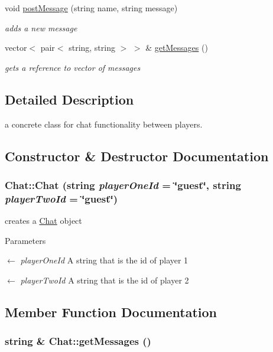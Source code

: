\begin{DoxyCompactItemize}
void \hyperlink{classChat_a02ce14db9d4c1c1aa7f5cb40df16eb60}{postMessage} (string name, string message)
\begin{DoxyCompactList}\small\item\em adds a new message \item\end{DoxyCompactList}\item 
vector$<$ pair$<$ string, string $>$ $>$ \& \hyperlink{classChat_a238969ca251c9fdd893b4466e6dea8ba}{getMessages} ()
\begin{DoxyCompactList}\small\item\em gets a reference to vector of messages \item\end{DoxyCompactList}\end{DoxyCompactItemize}


\subsection{Detailed Description}
a concrete class for chat functionality between players. 

\subsection{Constructor \& Destructor Documentation}
\hypertarget{classChat_abc23d9c9b254089b8f486bd0ef6bc225}{
\subsubsection[{Chat}]{\setlength{\rightskip}{0pt plus 5cm}Chat::Chat (string {\em playerOneId} = {\ttfamily \char`\"{}guest\char`\"{}}, \/  string {\em playerTwoId} = {\ttfamily \char`\"{}guest\char`\"{}})}}
\label{classChat_abc23d9c9b254089b8f486bd0ef6bc225}


creates a \hyperlink{classChat}{Chat} object 
\begin{DoxyParams}{Parameters}
\item[\mbox{$\leftarrow$} {\em playerOneId}]A string that is the id of player 1 \item[\mbox{$\leftarrow$} {\em playerTwoId}]A string that is the id of player 2 \end{DoxyParams}


\subsection{Member Function Documentation}
\hypertarget{classChat_a238969ca251c9fdd893b4466e6dea8ba}{
\subsubsection[{getMessages}]{\setlength{\rightskip}{0pt plus 5cm}string \& Chat::getMessages ()}}
\label{classChat_a238969ca251c9fdd893b4466e6dea8ba}


